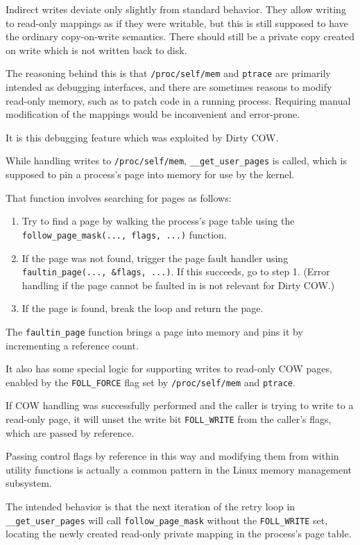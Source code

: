 \documentclass[a4paper,10pt,twocolumn,english]{article}
\newcommand{\code}[1]{\texttt{#1}}
\begin{document}
Indirect writes deviate only slightly from standard behavior.
They allow writing to read-only mappings as if they were writable,
but this is still supposed to have the ordinary copy-on-write semantics.
There should still be a private copy created on write which is not written back to disk.

The reasoning behind this is that \code{/proc/self/mem} and \code{ptrace} are primarily intended as debugging interfaces,
and there are sometimes reasons to modify read-only memory, such as to patch code in a running process.
Requiring manual modification of the mappings would be inconvenient and error-prone.

It is this debugging feature which was exploited by Dirty COW.

While handling writes to \code{/proc/self/mem}, \code{\_\_get\_user\_pages} is called, which is supposed to pin a process's page into memory for use by the kernel.

That function involves searching for pages as follows:

\begin{enumerate}
	\item Try to find a page by walking the process's page table using the \code{follow\_page\_mask(..., flags, ...)} function.
	\item If the page was not found, trigger the page fault handler using \code{faultin\_page(..., \&flags, ...)}. If this succeeds, go to step 1. (Error handling if the page cannot be faulted in is not relevant for Dirty COW.)
	\item If the page is found, break the loop and return the page.
\end{enumerate}

The \code{faultin\_page} function brings a page into memory and pins it by incrementing a reference count.

It also has some special logic for supporting writes to read-only COW pages, enabled by the \code{FOLL\_FORCE} flag set by \code{/proc/self/mem} and \code{ptrace}.

If COW handling was successfully performed and the caller is trying to write to a read-only page, it will unset the write bit \code{FOLL\_WRITE} from the caller's flags, which are passed by reference.

Passing control flags by reference in this way and modifying them from within utility functions is actually a common pattern in the Linux memory management subsystem.

The intended behavior is that the next iteration of the retry loop in \code{\_\_get\_user\_pages} will call \code{follow\_page\_mask} without the \code{FOLL\_WRITE} set,
locating the newly created read-only private mapping in the process's page table.
\end{document}
